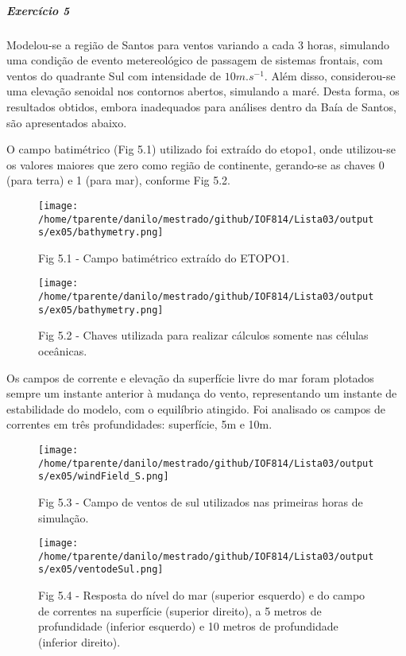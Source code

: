 \documentclass[11pt]{article}
\makeatletter
\def\maxwidth{\ifdim\Gin@nat@width>\linewidth\linewidth
    \else\Gin@nat@width\fi}
\let\Oldincludegraphics\includegraphics
\renewcommand{\includegraphics}[1]{\Oldincludegraphics[width=.8\maxwidth]{#1}}
\makeatother
\begin{document}
    \subparagraph{Exercício 5}\label{exercuxedcio-5}

Modelou-se a região de Santos para ventos variando a cada 3 horas,
simulando uma condição de evento metereológico de passagem de sistemas
frontais, com ventos do quadrante Sul com intensidade de
\(10 m.s^{-1}\). Além disso, considerou-se uma elevação senoidal nos
contornos abertos, simulando a maré. Desta forma, os resultados obtidos,
embora inadequados para análises dentro da Baía de Santos, são
apresentados abaixo.

O campo batimétrico (Fig 5.1) utilizado foi extraído do etopo1, onde
utilizou-se os valores maiores que zero como região de continente,
gerando-se as chaves 0 (para terra) e 1 (para mar), conforme Fig 5.2.


\begin{figure}[!ht]
\centering
\centerline{\hbox{\texttt{[image: /home/tparente/danilo/mestrado/github/IOF814/Lista03/outputs/ex05/bathymetry.png]}}}
\caption{Fig 5.1 - Campo batimétrico extraído do ETOPO1.}
\label{fig5:1}
\end{figure}

\begin{figure}[!ht]
\centering
\centerline{\hbox{\texttt{[image: /home/tparente/danilo/mestrado/github/IOF814/Lista03/outputs/ex05/bathymetry.png]}}}
\caption{Fig 5.2 - Chaves utilizada para realizar cálculos somente nas células oceânicas.}
\label{fig5:2}
\end{figure}

Os campos de corrente e elevação da superfície livre do mar foram
plotados sempre um instante anterior à mudança do vento, representando
um instante de estabilidade do modelo, com o equilíbrio atingido. Foi
analisado os campos de correntes em três profundidades: superfície, 5m e
10m.

\begin{figure}[!ht]
\centering
\centerline{\hbox{\texttt{[image: /home/tparente/danilo/mestrado/github/IOF814/Lista03/outputs/ex05/windField\_S.png]}}}
\caption{Fig 5.3 - Campo de ventos de sul utilizados nas primeiras horas de simulação.}
\label{fig5:3}
\end{figure}

\begin{figure}[!ht]
\centering
\centerline{\hbox{\texttt{[image: /home/tparente/danilo/mestrado/github/IOF814/Lista03/outputs/ex05/ventodeSul.png]}}}
\caption{Fig 5.4 - Resposta do nível do mar (superior esquerdo) e do campo de correntes na superfície (superior direito), a 5 metros de profundidade (inferior esquerdo) e
10 metros de profundidade (inferior direito).}
\label{fig5:4}
\end{figure}
\end{document}
